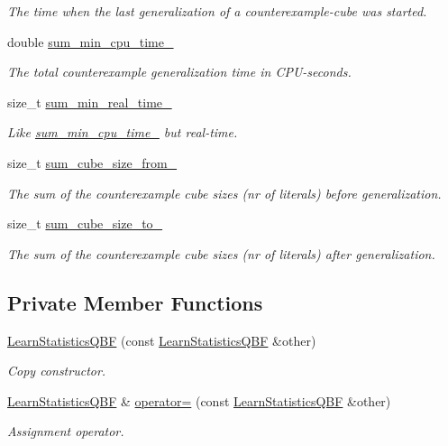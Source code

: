\begin{DoxyCompactItemize}
\begin{DoxyCompactList}\small\item\em The time when the last generalization of a counterexample-\/cube was started. \end{DoxyCompactList}\item 
double \hyperlink{classLearnStatisticsQBF_a8fcce1bc5593631429c86bd3a1376e86}{sum\-\_\-min\-\_\-cpu\-\_\-time\-\_\-}
\begin{DoxyCompactList}\small\item\em The total counterexample generalization time in C\-P\-U-\/seconds. \end{DoxyCompactList}\item 
size\-\_\-t \hyperlink{classLearnStatisticsQBF_a6aded3992cd822a0ca45bc2d6658a5ab}{sum\-\_\-min\-\_\-real\-\_\-time\-\_\-}
\begin{DoxyCompactList}\small\item\em Like \hyperlink{classLearnStatisticsQBF_a8fcce1bc5593631429c86bd3a1376e86}{sum\-\_\-min\-\_\-cpu\-\_\-time\-\_\-} but real-\/time. \end{DoxyCompactList}\item 
size\-\_\-t \hyperlink{classLearnStatisticsQBF_a46277893a5465fb97805624e1ac31f38}{sum\-\_\-cube\-\_\-size\-\_\-from\-\_\-}
\begin{DoxyCompactList}\small\item\em The sum of the counterexample cube sizes (nr of literals) before generalization. \end{DoxyCompactList}\item 
size\-\_\-t \hyperlink{classLearnStatisticsQBF_a444ff1c70c90edfd87a56790060c0aae}{sum\-\_\-cube\-\_\-size\-\_\-to\-\_\-}
\begin{DoxyCompactList}\small\item\em The sum of the counterexample cube sizes (nr of literals) after generalization. \end{DoxyCompactList}\end{DoxyCompactItemize}
\subsection*{Private Member Functions}
\begin{DoxyCompactItemize}
\item 
\hyperlink{classLearnStatisticsQBF_a52c8f98a5b32ce587b73f7b6f921298d}{Learn\-Statistics\-Q\-B\-F} (const \hyperlink{classLearnStatisticsQBF}{Learn\-Statistics\-Q\-B\-F} \&other)
\begin{DoxyCompactList}\small\item\em Copy constructor. \end{DoxyCompactList}\item 
\hyperlink{classLearnStatisticsQBF}{Learn\-Statistics\-Q\-B\-F} \& \hyperlink{classLearnStatisticsQBF_ad381a6f0a78d73aaed2d87e00b5d9ea9}{operator=} (const \hyperlink{classLearnStatisticsQBF}{Learn\-Statistics\-Q\-B\-F} \&other)
\begin{DoxyCompactList}\small\item\em Assignment operator. \end{DoxyCompactList}\end{DoxyCompactItemize}



